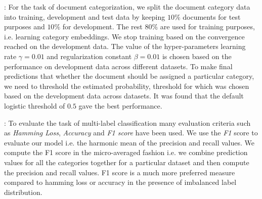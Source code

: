  : For the task of document categorization, we split the document category data into training, development and test data by keeping $10\%$ documents for test purposes and $10\%$ for development. The rest $80\%$ are used for training purposes, i.e. learning category embeddings. We stop training based on the convergence reached on the development data. The value of the hyper-parameters learning rate $\gamma = 0.01$ and regularization constant $\beta = 0.01$ is chosen based on the performance on development data across different datasets. To make final predictions that whether the document should be assigned a particular category, we need to threshold the estimated probability, threshold for which was chosen based on the development data across datasets. It was found that the default logistic threshold of $0.5$ gave the best performance.

 : To evaluate the task of multi-label classification many evaluation criteria such as \emph{Hamming Loss}, \emph{Accuracy} and \emph{F1 score} have been used. We use the \emph{F1} score to evaluate our model i.e. the harmonic mean of the precision and recall values. We compute the F1 score in the micro-averaged fashion i.e. we combine prediction values for all the categories together for a particular dataset and then compute the precision and recall values. F1 score is a much more preferred measure compared to hamming loss or accuracy in the presence of imbalanced label distribution.


